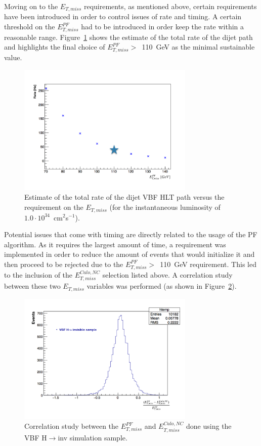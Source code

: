 \hspace{10pt} Moving on to the $E_{T,miss}$ requirements, as mentioned above, certain requirements have been introduced in order to control issues of rate and timing. A certain threshold on the $E^{PF}_{T,miss}$ had to be introduced in order keep the rate within a reasonable range. Figure~\ref{fig:PFMETvsRate} shows the estimate of the total rate of the dijet path and highlights the final choice of $E^{PF}_{T,miss}>$~110~GeV as the minimal sustainable value.
\begin{figure}[!htbp]
  \centering
    \includegraphics[width=0.75\textwidth]{CMS_experiment/PFMETvsRate.pdf}
  \caption{Estimate of the total rate of the dijet VBF HLT path versus the requirement on the $E_{T,miss}$ (for the instantaneous luminosity of $1.0\cdot10^{34}$~cm$^2$s$^{-1}$).}
  \label{fig:PFMETvsRate}
\end{figure}
Potential issues that come with timing are directly related to the usage of the PF algorithm. As it requires the largest amount of time, a requirement was implemented in order to reduce the amount of events that would initialize it and then proceed to be rejected due to the $E^{PF}_{T,miss}>$~110~GeV requirement. This led to the inclusion of the $E^{Calo, NC}_{T,miss}$ selection listed above. A correlation study between these two $E_{T,miss}$ variables was performed (as shown in Figure~\ref{fig:VBF_rates_timing}). 
\begin{figure}[!htbp]
  \centering
    \includegraphics[width=0.75\textwidth]{CMS_experiment/PFvsCaloMET.pdf}
  \caption{Correlation study between the $E^{PF}_{T,miss}$ and $E^{Calo,NC}_{T,miss}$ done using the VBF H$\rightarrow$inv simulation sample.}
  \label{fig:VBF_rates_timing}
\end{figure}
